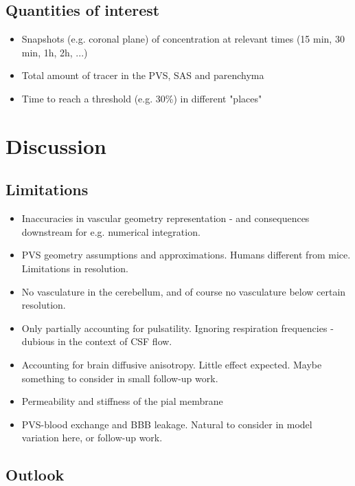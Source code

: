 \documentclass[fleqn,10pt]{wlscirep}
\begin{document}
\subsection*{Quantities of interest}

\begin{itemize}
    \item Snapshots (e.g. coronal plane) of concentration at relevant times (15 min, 30 min, 1h, 2h, ...) 
    \item Total amount of tracer in the PVS, SAS and parenchyma
     \item Time to reach a threshold (e.g. 30\%) in different "places"
\end{itemize}


\section*{Discussion}

\subsection*{Limitations}

\begin{itemize}
\item 
  Inaccuracies in vascular geometry representation - and consequences downstream for e.g. numerical integration.
\item
  PVS geometry assumptions and approximations. Humans different from mice. Limitations in resolution.
\item
  No vasculature in the cerebellum, and of course no vasculature below certain resolution.
\item
  Only partially accounting for pulsatility. Ignoring respiration frequencies - dubious in the context of CSF flow.
\item
  Accounting for brain diffusive anisotropy. Little effect expected. Maybe something to consider in small follow-up work.
\item
  Permeability and stiffness of the pial membrane
\item
  PVS-blood exchange and BBB leakage. Natural to consider in model variation here, or follow-up work.
\end{itemize}

\subsection*{Outlook}
\end{document}
